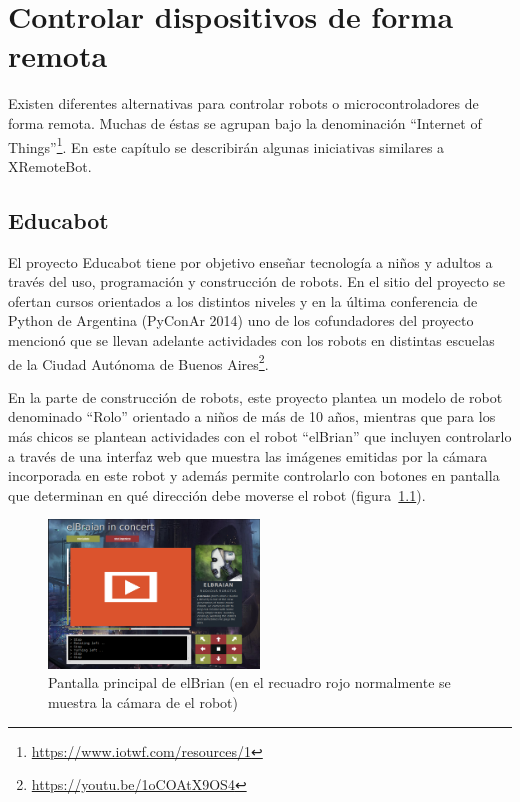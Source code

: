 \chapter{Controlar dispositivos de forma remota}\label{cha:arte}

Existen diferentes alternativas para controlar robots o microcontroladores
de forma remota. Muchas de éstas se agrupan bajo la denominación
``Internet of Things''\footnote{\url{https://www.iotwf.com/resources/1}}.
En este capítulo se describirán algunas iniciativas similares a XRemoteBot.

\section{Educabot}
El proyecto Educabot tiene por
objetivo enseñar tecnología a niños y adultos a través
del uso, programación y construcción de robots. En el sitio del proyecto
se ofertan cursos orientados a los distintos niveles y 
en la última conferencia de Python de Argentina (PyConAr 2014) uno de
los cofundadores del proyecto mencionó que se llevan adelante actividades
con los robots
en distintas escuelas de la Ciudad Autónoma de Buenos
Aires\footnote{\url{https://youtu.be/1oCOAtX9OS4}}.


En la parte de construcción de robots, este proyecto plantea un modelo
de robot denominado
``Rolo'' orientado a niños de más de 10 años, mientras que para los más
chicos se plantean actividades con el robot ``elBrian'' que incluyen
controlarlo a través de una interfaz web que muestra las imágenes emitidas
por la cámara incorporada en este robot y además permite controlarlo con
botones en pantalla que determinan en qué dirección debe moverse el robot
(figura~\ref{fig:elbrian}).

\begin{figure}
    \centering
    \includegraphics[width=0.5\textwidth]{figures/elbrian-1}
    \caption{Pantalla principal de elBrian (en el recuadro rojo normalmente
        se muestra la cámara de el robot)}
    \label{fig:elbrian}
\end{figure}

